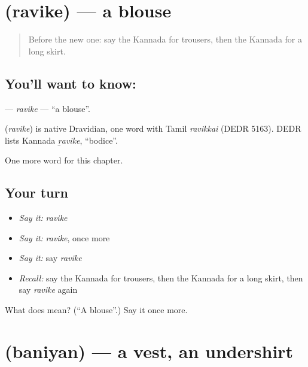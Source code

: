 \section[\texorpdfstring{\kn{ರವಿಕೆ} (ravike)}{ರವಿಕೆ (ravike)}]{ (ravike) — a blouse}

\label{lesson:KA-C222-ravike}



\begin{quote}
Before the new one: say the Kannada for trousers, then the Kannada for a long skirt.
\end{quote}

\subsection*{You'll want to know: }
\textbf{} — \emph{ravike} — \textquotedblleft{}a blouse\textquotedblright{}.

\begin{cousinweb}
\textbf{} (\emph{ravike}) is native Dravidian, one word with Tamil \emph{ravikkai} (DEDR 5163). DEDR lists Kannada \emph{ṟavike}, \textquotedblleft{}bodice\textquotedblright{}.
\end{cousinweb}

\begin{grammarlens}[title={What you've built}]
One more word for this chapter.
\end{grammarlens}

\subsection*{Your turn}
\begin{itemize}
\raggedright
  \item \emph{Say it:} \emph{ravike}
  \item \emph{Say it:} \emph{ravike}, once more
  \item \emph{Say it:} say \emph{ravike}
  \item \emph{Recall:} say the Kannada for trousers, then the Kannada for a long skirt, then say \emph{ravike} again
\end{itemize}

\begin{tcolorbox}[breakable,colback=teal!4,colframe=teal!35!black,title={Before you move on}]
What does  mean? (\textquotedblleft{}A blouse\textquotedblright{}.) Say it once more.
\end{tcolorbox}
\section[\texorpdfstring{\kn{ಬನಿಯನ್} (baniyan)}{ಬನಿಯನ್ (baniyan)}]{ (baniyan) — a vest, an undershirt}

